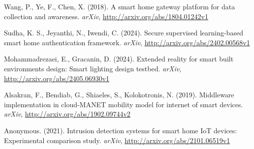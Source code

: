 \documentclass[conference]{IEEEtran}
\begin{document}
\begin{thebibliography}{99}

Wang, P., Ye, F., Chen, X. (2018). A smart home gateway platform for data collection and awareness. \textit{arXiv}, \url{http://arxiv.org/abs/1804.01242v1}

Sudha, K. S., Jeyanthi, N., Iwendi, C. (2024). Secure supervised learning-based smart home authentication framework. \textit{arXiv}, \url{http://arxiv.org/abs/2402.00568v1}

Mohammadrezaei, E., Gracanin, D. (2024). Extended reality for smart built environments design: Smart lighting design testbed. \textit{arXiv}, \url{http://arxiv.org/abs/2405.06930v1}

Alsakran, F., Bendiab, G., Shiaeles, S., Kolokotronis, N. (2019). Middleware implementation in cloud-MANET mobility model for internet of smart devices. \textit{arXiv}, \url{http://arxiv.org/abs/1902.09744v2}

Anonymous. (2021). Intrusion detection systems for smart home IoT devices: Experimental comparison study. \textit{arXiv}, \url{http://arxiv.org/abs/2101.06519v1}

\end{thebibliography}
\end{document}
